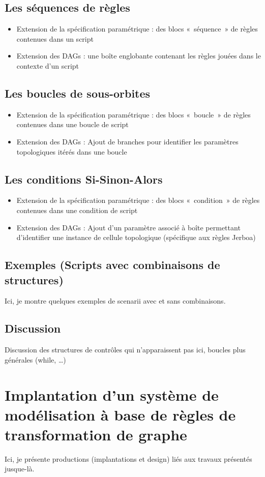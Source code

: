 \documentclass[11pt]{article}
\begin{document}
\subsection{Les séquences de règles}
\label{sec:orgb8671fe}
\begin{itemize}
\item Extension de la spécification paramétrique : des blocs « séquence » de règles contenues dans un script
\item Extension des DAGs : une boîte englobante contenant les règles jouées dans le contexte d'un script
\end{itemize}
\subsection{Les boucles de sous-orbites}
\label{sec:org5d322ab}
\begin{itemize}
\item Extension de la spécification paramétrique : des blocs « boucle » de règles contenues dans une boucle de script
\item Extension des DAGs : Ajout de branches pour identifier les paramètres topologiques itérés dans une boucle
\end{itemize}
\subsection{Les conditions Si-Sinon-Alors}
\label{sec:orgbe920c6}
\begin{itemize}
\item Extension de la spécification paramétrique : des blocs « condition » de règles contenues dans une condition de script
\item Extension des DAGs : Ajout d'un paramètre associé à boîte permettant d'identifier une instance de cellule topologique (spécifique aux règles Jerboa)
\end{itemize}
\subsection{Exemples (Scripts avec combinaisons de structures)}
\label{sec:orgcd937da}
Ici, je montre quelques exemples de scenarii avec et sans combinaisons.
\subsection{Discussion}
\label{sec:org7362512}
Discussion des structures de contrôles qui n'apparaissent pas ici, boucles plus générales (while, …)
\section{Implantation d'un système de modélisation à base de règles de transformation de graphe}
\label{sec:org2916a8a}
Ici, je présente productions (implantations et design) liés aux travaux présentés jusque-là.
\end{document}
